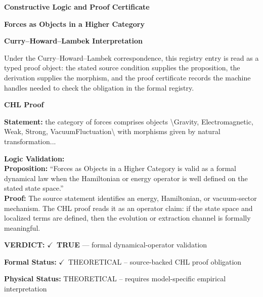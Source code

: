 \clearpage
\begingroup\tzpsupportsetup
\noindent\textbf{\fontsize{10.8pt}{12.8pt}\selectfont [ID 0157] Constructive Logic and Proof Certificate}\par
\noindent\textbf{\fontsize{10pt}{12pt}\selectfont Forces as Objects in a Higher Category}\par
\vspace{0.45em}
\begingroup
\footnotesize
\setlength{\parskip}{0.22em}
\setlength{\parindent}{0pt}
\noindent\textbf{Curry--Howard--Lambek Interpretation}\par
Under the Curry--Howard--Lambek correspondence, this registry entry is read as a typed proof
object: the stated source condition supplies the proposition, the derivation supplies the
morphism, and the proof certificate records the machine handles needed to check the obligation
in the formal registry.

\vspace{0.45em}
\noindent\textbf{CHL Proof}\par
\textbf{Statement:} the category of forces comprises objects \textbackslash{}Gravity, Electromagnetic, Weak, Strong,
VacuumFluctuation\textbackslash{} with morphisms given by natural transformation...

\textbf{Logic Validation:}\\
\textbf{Proposition:} ``Forces as Objects in a Higher Category is valid as a formal dynamical law when the
Hamiltonian or energy operator is well defined on the stated state space.''\\
\textbf{Proof:} The source statement identifies an energy, Hamiltonian, or vacuum-sector mechanism. The
CHL proof reads it as an operator claim: if the state space and localized terms are
defined, then the evolution or extraction channel is formally meaningful.

\textbf{VERDICT:} \ensuremath{\checkmark}\ \textbf{TRUE} --- formal dynamical-operator validation

\textbf{Formal Status:} \ensuremath{\checkmark}\ THEORETICAL -- source-backed CHL proof obligation

\textbf{Physical Status:} THEORETICAL -- requires model-specific empirical interpretation
\par\vspace{0.45em}
\par
\ifTZPDarkEdition
{}
\fi
\endgroup
\endgroup
